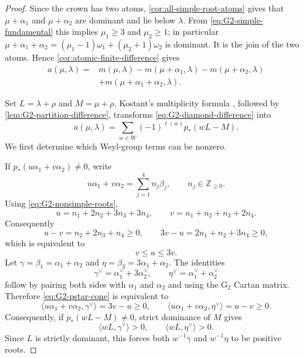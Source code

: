 \documentclass[11pt]{article}
\theoremstyle{definition}
\theoremstyle{remark}
\newcommand{\typeG}{\ensuremath{\mathrm{G}}}
\begin{document}
\begin{proof}
Since the crown has two atoms, \cref{cor:all-simple-root-atoms} gives that
$\mu+\alpha_1$ and $\mu+\alpha_2$ are dominant and lie below $\lambda$.
From \eqref{eq:G2-simple-fundamental} this implies
$\mu_1\ge3$ and $\mu_2\ge1$; in particular
$\mu+\alpha_1+\alpha_2=(\mu_1-1)\omega_1+(\mu_2+1)\omega_2$ is dominant.
It is the join of the two atoms.  Hence
\cref{cor:atomic-finite-difference} gives
\begin{equation}\label{eq:G2-diamond-difference}
\begin{split}
 a(\mu,\lambda)={}&m(\mu,\lambda)
 -m(\mu+\alpha_1,\lambda)-m(\mu+\alpha_2,\lambda)\\
 &+m(\mu+\alpha_1+\alpha_2,\lambda).
\end{split}
\end{equation}

Set $L=\lambda+\rho$ and $M=\mu+\rho$.  Kostant's multiplicity formula
\cite{MR0109192}, followed by \cref{lem:G2-partition-difference}, transforms
\eqref{eq:G2-diamond-difference} into
\begin{equation}\label{eq:G2-Weyl-pstar}
 a(\mu,\lambda)
   =\sum_{w\in W}(-1)^{\ell(w)}p_*(wL-M).
\end{equation}
We first determine which Weyl-group terms can be nonzero.

If $p_*(u\alpha_1+v\alpha_2)\ne0$, write
\[
 u\alpha_1+v\alpha_2=\sum_{j=1}^4 n_j\beta_j,
 \qquad n_j\in\mathbb Z_{\ge0}.
\]
Using \eqref{eq:G2-nonsimple-roots},
\[
 u=n_1+2n_2+3n_3+3n_4,
 \qquad
 v=n_1+n_2+n_3+2n_4.
\]
Consequently
\[
 u-v=n_2+2n_3+n_4\ge0,
 \qquad
 3v-u=2n_1+n_2+3n_4\ge0,
\]
which is equivalent to
\begin{equation}\label{eq:G2-pstar-cone}
       v\le u\le3v.
\end{equation}
Let
$\gamma=\beta_1=\alpha_1+\alpha_2$ and
$\eta=\beta_3=3\alpha_1+\alpha_2$.  The identities
\[
 \gamma^\vee=\alpha_1^\vee+3\alpha_2^\vee,
 \qquad
 \eta^\vee=\alpha_1^\vee+\alpha_2^\vee
\]
follow by pairing both sides with $\alpha_1$ and $\alpha_2$ and using the
$\typeG_2$ Cartan matrix.  Therefore \eqref{eq:G2-pstar-cone} is equivalent to
\[
 \langle u\alpha_1+v\alpha_2,\gamma^\vee\rangle=3v-u\ge0,
 \qquad
 \langle u\alpha_1+v\alpha_2,\eta^\vee\rangle=u-v\ge0.
\]
Consequently, if $p_*(wL-M)\ne0$, strict dominance of $M$ gives
\[
       \langle wL,\gamma^\vee\rangle>0,
       \qquad
       \langle wL,\eta^\vee\rangle>0.
\]
Since $L$ is strictly dominant, this forces both $w^{-1}\gamma$ and
$w^{-1}\eta$ to be positive roots.


\end{proof}
\end{document}
